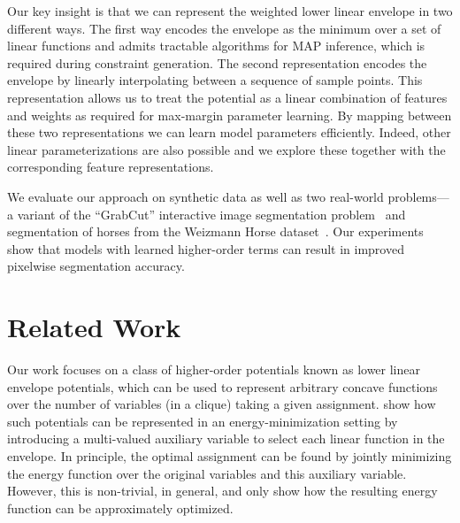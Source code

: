 \documentclass[10pt,journal,letterpaper,compsoc]{IEEEtran}
\renewcommand{\citename}{\citet}
\renewcommand{\cite}{\citep}
\begin{document}
Our key insight is that we can represent the weighted lower linear
envelope in two different ways. The first way encodes the envelope as
the minimum over a set of linear functions and admits tractable
algorithms for MAP inference, which is required during constraint
generation. The second representation encodes the envelope by linearly
interpolating between a sequence of sample points. This representation
allows us to treat the potential as a linear combination of features
and weights as required for max-margin parameter learning. By mapping
between these two representations we can learn model parameters
efficiently. Indeed, other linear parameterizations are also possible
and we explore these together with the corresponding feature
representations.

We evaluate our approach on synthetic data as well as two real-world
problems---a variant of the ``GrabCut'' interactive image segmentation
problem~\cite{Rother:SIGGRAPH04} and segmentation of horses from the
Weizmann Horse dataset~\cite{Borenstein:ECCV02}. Our experiments show
that models with learned higher-order terms can result in improved
pixelwise segmentation accuracy.

\section{Related Work}
\label{sec:background}

Our work focuses on a class of higher-order potentials known as lower
linear envelope potentials, which can be used to represent arbitrary
concave functions over the number of variables (in a clique) taking a
given assignment. \citename{Kohli:CVPR10} show how such potentials can
be represented in an energy-minimization setting by introducing a
multi-valued auxiliary variable to select each linear function in the
envelope. In principle, the optimal assignment can be found by jointly
minimizing the energy function over the original variables and this
auxiliary variable. However, this is non-trivial, in general, and
\citename{Kohli:CVPR10} only show how the resulting energy function
can be approximately optimized.
\end{document}
